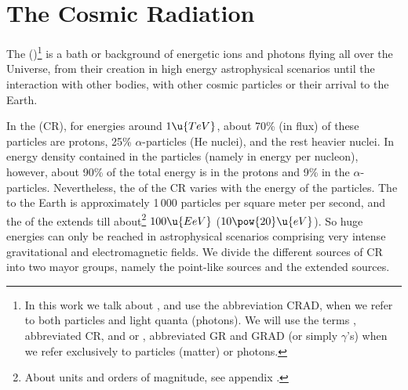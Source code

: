 

\chapter{The Cosmic Radiation}
\label{chapter:cosmicrad}
\let\rightmark\leftmark

\label{sec:cosmicradiation}

The \emph{} ()\footnote{In this work we
  talk about \emph{}, and use the abbreviation
  CRAD, when we refer to both particles and light quanta (photons). We
  will use the terms \emph{}, abbreviated CR, and
  \emph{} or \emph{}, abbreviated GR
  and GRAD (or simply $\gamma$'s) when we refer exclusively to
  particles (matter) or photons.}  is a bath or background of
energetic ions and photons flying all over the Universe, from their
creation in high energy astrophysical scenarios until the interaction
with other bodies, with other cosmic particles or their arrival to the
Earth.

In the \emph{} (CR), for energies around $1\u{TeV}$,
about 70\% (in flux) of these particles are protons, 25\% $\alpha$-particles
(He nuclei), and the rest heavier nuclei.  In energy density contained
in the particles (namely in energy per nucleon), however, about 90\% of
the total energy is in the protons and 9\% in the $\alpha$-particles.
Nevertheless, the   of the
CR varies with the energy of the particles.  The 
to the Earth is approximately 1\,000 particles per square meter per
second, and the  of the \emph{}
extends till about\footnote{About units and orders of magnitude, see
  appendix .}  $100\u{EeV}$
($10\pow{20}\u{eV}$).  So huge energies can only be reached in
astrophysical scenarios comprising very intense gravitational and
electromagnetic fields. We divide the different sources of CR into two
mayor groups, namely the point-like sources and the extended sources.

